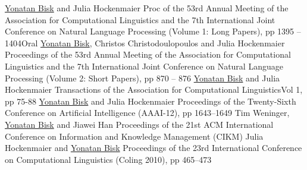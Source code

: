 \documentclass[10pt,letter]{moderncv}
\newcommand{\YB}{\underline{Yonatan Bisk}}
\begin{document}
  {\href{http://yonatanbisk.com/papers/2015-ACL.pdf}{\color{linkcolor}{Probing the Linguistic Strengths and Limitations of Unsupervised Grammar Induction}}}
  {\YB{} and Julia Hockenmaier}
  {Proc of the 53rd Annual Meeting of the Association for Computational Linguistics and the 7th International Joint Conference on Natural Language Processing (Volume 1: Long Papers), pp 1395 -- 1404}{Oral}{}
\pub{--}
  {\href{http://yonatanbisk.com/papers/2015-ACLShort-Fixed.pdf}{\color{linkcolor}{Labeled Grammar Induction with Minimal Supervision}}}
  {\YB, Christos Christodoulopoulos and Julia Hockenmaier}
  {Proceedings of the 53rd Annual Meeting of the Association for Computational Linguistics and the 7th International Joint Conference on Natural Language Processing (Volume 2: Short Papers), pp 870 -- 876 }{}{}
  {\href{http://yonatanbisk.com/papers/2013-TACL.pdf}{\color{linkcolor}{An HDP Model for Inducing Combinatory Categorial Grammars}}}
  {\YB{} and Julia Hockenmaier}
  {Transactions of the Association for Computational Linguistics}{Vol 1, pp 75-88}{}
  {\href{http://yonatanbisk.com/papers/2012-AAAI.pdf}{\color{linkcolor}{Simple Robust Grammar Induction with Combinatory Categorial Grammars}}}
  {\YB{} and Julia Hockenmaier}
  {Proceedings of the Twenty-Sixth Conference on Artificial Intelligence (AAAI-12), pp 1643--1649}{}{}
\pub{--}
  {\href{http://yonatanbisk.com/papers/2012-CIKM.pdf}{\color{linkcolor}{Document-Topic Hierarchies from Document Graphs}}}
  {Tim Weninger, \YB{} and Jiawei Han}
  {Proceedings of the 21st ACM International Conference on Information and Knowledge Management (CIKM)}{}{}
  {\href{http://yonatanbisk.com/papers/2010-COLING.pdf}{\color{linkcolor}{Normal-form parsing for Combinatory Categorial Grammars with generalized composition and type-raising}}}
  {Julia Hockenmaier and \YB{}}
  {Proceedings of the 23rd International Conference on Computational Linguistics (Coling 2010), pp 465--473}{}{}
\end{document}
